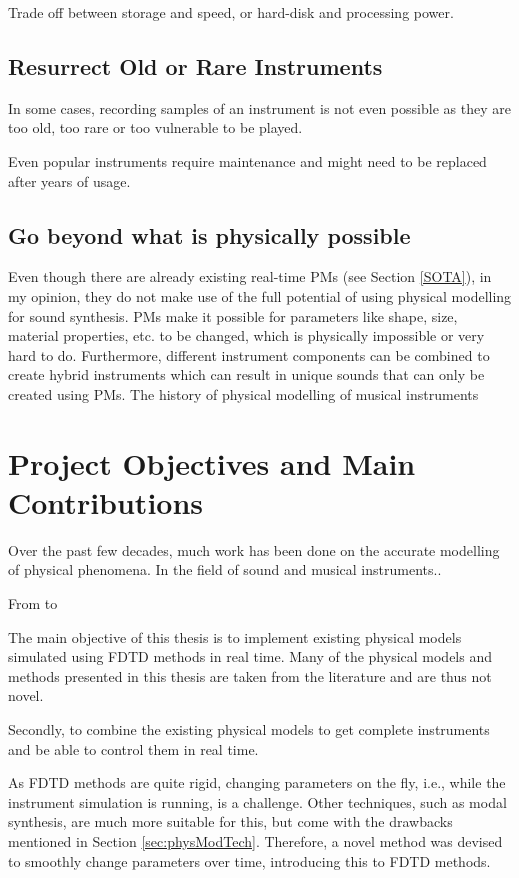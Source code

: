 Trade off between storage and speed, or hard-disk and processing power.


\subsection{Resurrect Old or Rare Instruments}
In some cases, recording samples of an instrument is not even possible as they are too old, too rare or too vulnerable to be played. 


Even popular instruments require maintenance and might need to be replaced after years of usage. 




\subsection{Go beyond what is physically possible} 
Even though there are already existing real-time PMs (see Section \ref{SOTA}), in my opinion, they do not make use of the full potential of using physical modelling for sound synthesis. PMs make it possible for parameters like shape, size, material properties, etc. to be changed, which is physically impossible or very hard to do. Furthermore, different instrument components can be combined to create hybrid instruments which can result in unique sounds that can only be created using PMs.
The history of physical modelling of musical instruments

\section{Project Objectives and Main Contributions}
Over the past few decades, much work has been done on the accurate modelling of physical phenomena. In the field of sound and musical instruments.. 

From \cite{Fletcher1998} to \cite{Bilbao2019CMJb}



The main objective of this thesis is to implement existing physical models simulated using FDTD methods in real time. Many of the physical models and methods presented in this thesis are taken from the literature and are thus not novel. 

Secondly, to combine the existing physical models to get complete instruments and be able to control them in real time.

As FDTD methods are quite rigid, changing parameters on the fly, i.e., while the instrument simulation is running, is a challenge.  Other techniques, such as modal synthesis, are much more suitable for this, but come with the drawbacks mentioned in Section \ref{sec:physModTech}. Therefore, a novel method was devised to smoothly change parameters over time, introducing this to FDTD methods. 

